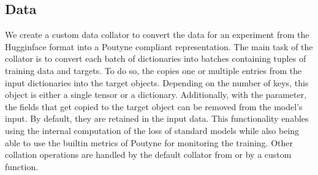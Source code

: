 \documentclass[letterpaper,10pt,english]{jupyterBook}
\begin{document}
\subsection{Data}
\label{\detokenize{Poutyne:id3}}
\sphinxAtStartPar
We create a custom data collator to convert the data for an experiment from the Hugginface  format into a Poutyne compliant representation.
The main task of the collator is to convert each batch of dictionaries into batches containing tuples of training data and targets.
To do so, the  copies one or multiple entries from the input dictionaries into the target objects. Depending on the number of keys, this object is either a single tensor or a dictionary.
Additionally, with the \sphinxhyphen{}parameter, the fields that get copied to the target object can be removed from the model’s input. By default, they are retained in the input data. This functionality enables using the internal computation of the loss of standard models while also being able to use the built\sphinxhyphen{}in metrics of Poutyne for monitoring the training.
Other collation operations are handled by the default collator from  or by a custom function.
\end{document}
